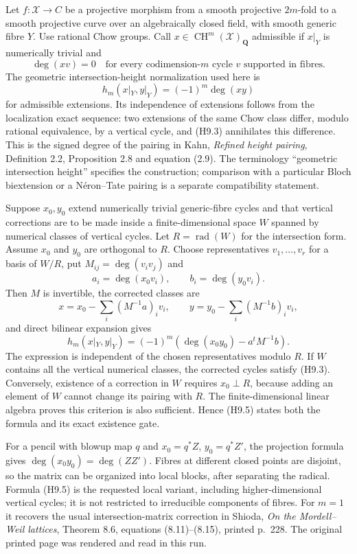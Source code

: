\documentclass[11pt,a4paper]{article}
\begin{document}
Let $f:\mathcal X\to C$ be a projective morphism from a smooth projective
$2m$-fold to a smooth projective curve over an algebraically closed field,
with smooth generic fibre $Y$. Use rational Chow groups. Call
$x\in\operatorname{CH}^m(\mathcal X)_{\mathbf Q}$ admissible if
$x|_Y$ is numerically trivial and
\[
 \deg(xv)=0
 \quad\text{for every codimension-$m$ cycle $v$ supported in fibres.}
                                                        \tag{H9.3}
\]
The geometric intersection-height normalization used here is
\[
 h_m(x|_Y,y|_Y)=(-1)^m\deg(xy)                    \tag{H9.4}
\]
for admissible extensions. Its independence of extensions follows from
the localization exact sequence: two extensions of the same Chow class
differ, modulo rational equivalence, by a vertical cycle, and (H9.3)
annihilates this difference. This is the signed degree of the pairing in
Kahn, \emph{Refined height pairing}, Definition 2.2, Proposition 2.8 and
equation (2.9). The terminology ``geometric intersection height'' specifies
the construction; comparison with a particular Bloch biextension or a
N\'eron--Tate pairing is a separate compatibility statement.

Suppose $x_0,y_0$ extend numerically trivial generic-fibre cycles and that
vertical corrections are to be made inside a finite-dimensional space
$W$ spanned by numerical classes of vertical cycles. Let
$R=\operatorname{rad}(W)$ for the intersection form. Assume $x_0$ and $y_0$
are orthogonal to $R$. Choose representatives $v_1,\ldots,v_r$ for a basis
of $W/R$, put $M_{ij}=\deg(v_iv_j)$ and
\[
 a_i=\deg(x_0v_i),\qquad b_i=\deg(y_0v_i).
\]
Then $M$ is invertible, the corrected classes are
\[
 x=x_0-\sum_i(M^{-1}a)_i v_i,\qquad
 y=y_0-\sum_i(M^{-1}b)_i v_i,
\]
and direct bilinear expansion gives
\[
 h_m(x|_Y,y|_Y)=(-1)^m\left(\deg(x_0y_0)-a^{\!t}M^{-1}b\right).
                                                        \tag{H9.5}
\]
The expression is independent of the chosen representatives modulo $R$.
If $W$ contains all the vertical numerical classes, the corrected cycles
satisfy (H9.3). Conversely, existence of a correction in $W$ requires
$x_0\perp R$, because adding an element of $W$ cannot change its pairing
with $R$. The finite-dimensional linear algebra proves this criterion is
also sufficient. Hence (H9.5) states both the formula and its exact
existence gate.

For a pencil with blowup map $q$ and $x_0=q^*Z$, $y_0=q^*Z'$, the
projection formula gives $\deg(x_0y_0)=\deg(ZZ')$. Fibres at different
closed points are disjoint, so the matrix can be organized into local
blocks, after separating the radical. Formula (H9.5) is the requested
local variant, including higher-dimensional vertical cycles; it is not
restricted to irreducible components of fibres. For $m=1$ it recovers the
usual intersection-matrix correction in Shioda, \emph{On the Mordell--Weil
lattices}, Theorem 8.6, equations (8.11)--(8.15), printed p.~228. The
original printed page was rendered and read in this run.
\end{document}
